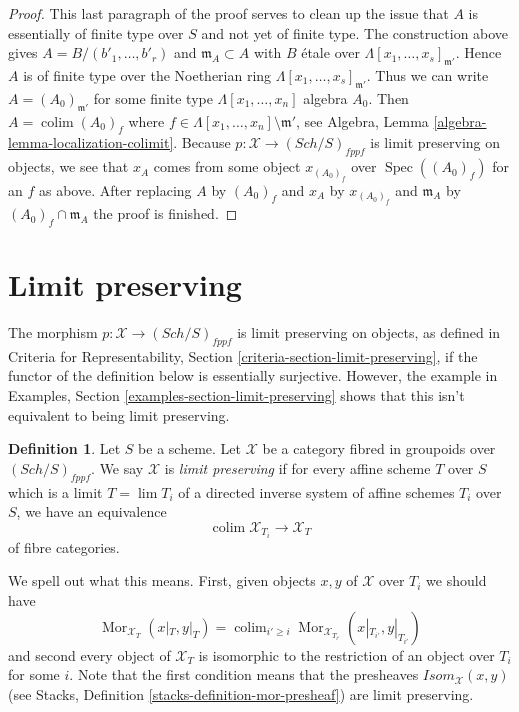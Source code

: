 \documentclass{stacks-project}
\theoremstyle{plain}
\theoremstyle{definition}
\newtheorem{definition}[subsection]{Definition}
\theoremstyle{remark}
\numberwithin{equation}{subsection}
\def\lim{\mathop{\mathrm{lim}}\nolimits}
\def\colim{\mathop{\mathrm{colim}}\nolimits}
\def\Spec{\mathop{\mathrm{Spec}}}
\def\Sch{\mathit{Sch}}
\def\Mor{\mathop{\mathrm{Mor}}\nolimits}
\begin{document}
\begin{proof}
\medskip\noindent
This last paragraph of the proof serves to clean up the issue that $A$ is
essentially of finite type over $S$ and not yet of finite type.
The construction above gives $A = B/(b'_1, \ldots, b'_r)$ and
$\mathfrak m_A \subset A$ with $B$ \'etale over
$\Lambda[x_1, \ldots, x_s]_{\mathfrak m'}$. Hence $A$ is of finite
type over the Noetherian ring $\Lambda[x_1, \ldots, x_s]_{\mathfrak m'}$.
Thus we can write $A = (A_0)_{\mathfrak m'}$ for some finite type
$\Lambda[x_1, \ldots, x_n]$ algebra $A_0$. Then
$A = \colim (A_0)_f$ where
$f \in \Lambda[x_1, \ldots, x_n] \setminus \mathfrak m'$, see
Algebra, Lemma \ref{algebra-lemma-localization-colimit}.
Because $p : \mathcal{X} \to (\Sch/S)_{fppf}$ is limit preserving on
objects, we see that
$x_A$ comes from some object $x_{(A_0)_f}$ over $\Spec((A_0)_f)$ for
an $f$ as above. After replacing $A$ by $(A_0)_f$ and $x_A$ by
$x_{(A_0)_f}$ and $\mathfrak m_A$ by $(A_0)_f \cap \mathfrak m_A$
the proof is finished.
\end{proof}





\section{Limit preserving}
\label{section-limits}

\noindent
The morphism $p : \mathcal{X} \to (\Sch/S)_{fppf}$ is limit preserving
on objects, as defined in Criteria for Representability, Section
\ref{criteria-section-limit-preserving}, if the functor of the definition
below is essentially surjective. However, the example
in Examples, Section \ref{examples-section-limit-preserving}
shows that this isn't equivalent to being limit preserving.

\begin{definition}
\label{definition-limit-preserving}
Let $S$ be a scheme. Let $\mathcal{X}$ be a category fibred in groupoids
over $(\Sch/S)_{fppf}$. We say $\mathcal{X}$ is {\it limit preserving}
if for every affine scheme $T$ over $S$ which is a limit $T = \lim T_i$
of a directed inverse system of affine schemes $T_i$ over $S$, we have
an equivalence
$$
\colim \mathcal{X}_{T_i} \longrightarrow \mathcal{X}_T
$$
of fibre categories.
\end{definition}

\noindent
We spell out what this means. First, given objects $x, y$ of $\mathcal{X}$
over $T_i$ we should have
$$
\Mor_{\mathcal{X}_T}(x|_T, y|_T) =
\colim_{i' \geq i} \Mor_{\mathcal{X}_{T_{i'}}}(x|_{T_{i'}}, y|_{T_{i'}})
$$
and second every object of $\mathcal{X}_T$ is isomorphic to the restriction
of an object over $T_i$ for some $i$. Note that the first condition means
that the presheaves $\mathit{Isom}_\mathcal{X}(x, y)$ (see
Stacks, Definition \ref{stacks-definition-mor-presheaf})
are limit preserving.
\end{document}

